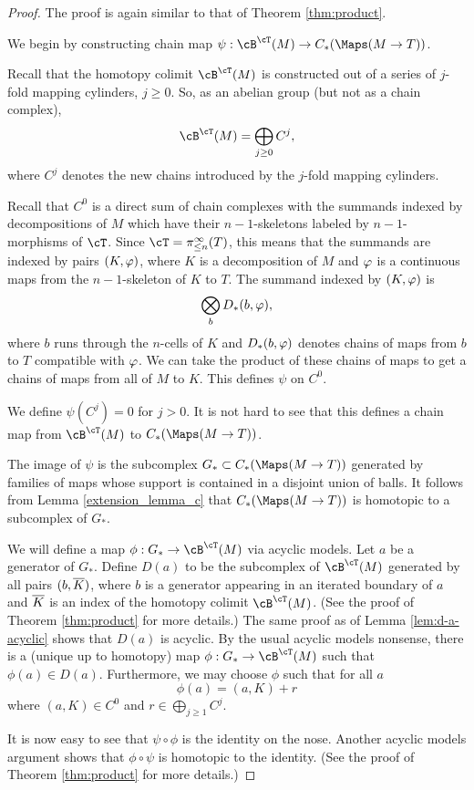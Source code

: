 \begin{proof}
The proof is again similar to that of Theorem \ref{thm:product}.

We begin by constructing chain map $\psi: \cB^\cT(M) \to C_*(\Maps(M\to T))$.

Recall that the homotopy colimit $\cB^\cT(M)$ is constructed out of a series of
$j$-fold mapping cylinders, $j \ge 0$.
So, as an abelian group (but not as a chain complex), 
\[
	\cB^\cT(M) = \bigoplus_{j\ge 0} C^j,
\]
where $C^j$ denotes the new chains introduced by the $j$-fold mapping cylinders.

Recall that $C^0$ is a direct sum of chain complexes with the summands indexed by
decompositions of $M$ which have their $n{-}1$-skeletons labeled by $n{-}1$-morphisms
of $\cT$.
Since $\cT = \pi^\infty_{\leq n}(T)$, this means that the summands are indexed by pairs
$(K, \varphi)$, where $K$ is a decomposition of $M$ and $\varphi$ is a continuous
maps from the $n{-}1$-skeleton of $K$ to $T$.
The summand indexed by $(K, \varphi)$ is
\[
	\bigotimes_b D_*(b, \varphi),
\]
where $b$ runs through the $n$-cells of $K$ and $D_*(b, \varphi)$ denotes
chains of maps from $b$ to $T$ compatible with $\varphi$.
We can take the product of these chains of maps to get a chains of maps from
all of $M$ to $K$.
This defines $\psi$ on $C^0$.

We define $\psi(C^j) = 0$ for $j > 0$.
It is not hard to see that this defines a chain map from 
$\cB^\cT(M)$ to $C_*(\Maps(M\to T))$.

The image of $\psi$ is the subcomplex $G_*\sub C_*(\Maps(M\to T))$ generated by 
families of maps whose support is contained in a disjoint union of balls.
It follows from Lemma \ref{extension_lemma_c} 
that $C_*(\Maps(M\to T))$ is homotopic to a subcomplex of $G_*$.

We will define a map $\phi:G_*\to \cB^\cT(M)$ via acyclic models.
Let $a$ be a generator of $G_*$.
Define $D(a)$ to be the subcomplex of $\cB^\cT(M)$ generated by all 
pairs $(b, \overline{K})$, where $b$ is a generator appearing in an iterated boundary of $a$
and $\overline{K}$ is an index of the homotopy colimit $\cB^\cT(M)$.
(See the proof of Theorem \ref{thm:product} for more details.)
The same proof as of Lemma \ref{lem:d-a-acyclic} shows that $D(a)$ is acyclic.
By the usual acyclic models nonsense, there is a (unique up to homotopy)
map $\phi:G_*\to \cB^\cT(M)$ such that $\phi(a)\in D(a)$.
Furthermore, we may choose $\phi$ such that for all $a$ 
\[
	\phi(a) = (a, K) + r
\]
where $(a, K) \in C^0$ and $r\in \bigoplus_{j\ge 1} C^j$.

It is now easy to see that $\psi\circ\phi$ is the identity on the nose.
Another acyclic models argument shows that $\phi\circ\psi$ is homotopic to the identity.
(See the proof of Theorem \ref{thm:product} for more details.)
\end{proof}

